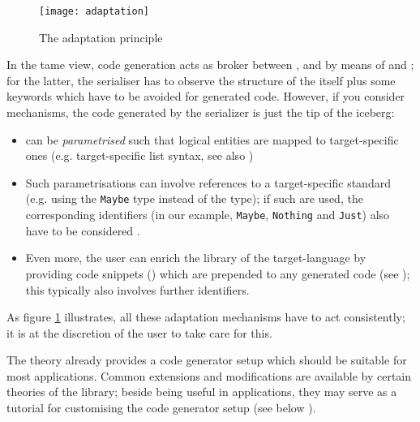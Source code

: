 \begin{isabellebody}
\begin{isamarkuptext}
  \begin{figure}[here]
    \texttt{[image: adaptation]}
    \caption{The adaptation principle}
    \label{fig:adaptation}
  \end{figure}

  \noindent In the tame view, code generation acts as broker between
  ,  and  by means of  and ; for the latter, the serialiser has to observe the
  structure of the  itself plus some 
  keywords which have to be avoided for generated code.  However, if
  you consider  mechanisms, the code generated by
  the serializer is just the tip of the iceberg:

  \begin{itemize}

    \item {} can be \emph{parametrised} such that
      logical entities are mapped to target-specific ones
      (e.g. target-specific list syntax, see also
      )

    \item Such parametrisations can involve references to a
      target-specific standard  (e.g. using the  \verb|Maybe| type instead of the 
       type); if such are used, the corresponding
      identifiers (in our example, \verb|Maybe|, \verb|Nothing| and \verb|Just|) also have to be considered .

    \item Even more, the user can enrich the library of the
      target-language by providing code snippets () which are prepended to any generated code (see
      ); this typically also involves further
       identifiers.

  \end{itemize}

  \noindent As figure \ref{fig:adaptation} illustrates, all these
  adaptation mechanisms have to act consistently; it is at the
  discretion of the user to take care for this.%
\end{isamarkuptext}%
\isamarkuptrue%
%
\isamarkuptrue%
%
\begin{isamarkuptext}%
The   theory already provides a code
  generator setup which should be suitable for most applications.
  Common extensions and modifications are available by certain
  theories of the  library; beside being useful in
  applications, they may serve as a tutorial for customising the code
  generator setup (see below ).


\end{isamarkuptext}
\end{isabellebody}
